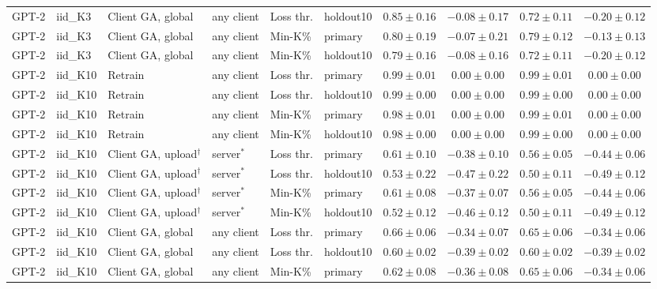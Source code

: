 \begin{table}[t]
\begin{tabular*}{\textwidth}{@{\extracolsep{\fill}}llllllcccc@{}}
GPT-2 & iid\_K3 & Client GA, global & any client & Loss thr. & holdout10 & $0.85 \pm 0.16$ & $-0.08 \pm 0.17$ & $0.72 \pm 0.11$ & $-0.20 \pm 0.12$ \\
GPT-2 & iid\_K3 & Client GA, global & any client & Min-K\% & primary & $0.80 \pm 0.19$ & $-0.07 \pm 0.21$ & $0.79 \pm 0.12$ & $-0.13 \pm 0.13$ \\
GPT-2 & iid\_K3 & Client GA, global & any client & Min-K\% & holdout10 & $0.79 \pm 0.16$ & $-0.08 \pm 0.16$ & $0.72 \pm 0.11$ & $-0.20 \pm 0.12$ \\
GPT-2 & iid\_K10 & Retrain & any client & Loss thr. & primary & $0.99 \pm 0.01$ & $0.00 \pm 0.00$ & $0.99 \pm 0.01$ & $0.00 \pm 0.00$ \\
GPT-2 & iid\_K10 & Retrain & any client & Loss thr. & holdout10 & $0.99 \pm 0.00$ & $0.00 \pm 0.00$ & $0.99 \pm 0.00$ & $0.00 \pm 0.00$ \\
GPT-2 & iid\_K10 & Retrain & any client & Min-K\% & primary & $0.98 \pm 0.01$ & $0.00 \pm 0.00$ & $0.99 \pm 0.01$ & $0.00 \pm 0.00$ \\
GPT-2 & iid\_K10 & Retrain & any client & Min-K\% & holdout10 & $0.98 \pm 0.00$ & $0.00 \pm 0.00$ & $0.99 \pm 0.00$ & $0.00 \pm 0.00$ \\
GPT-2 & iid\_K10 & Client GA, upload$^{\dagger}$ & server$^{*}$ & Loss thr. & primary & $0.61 \pm 0.10$ & $-0.38 \pm 0.10$ & $0.56 \pm 0.05$ & $-0.44 \pm 0.06$ \\
GPT-2 & iid\_K10 & Client GA, upload$^{\dagger}$ & server$^{*}$ & Loss thr. & holdout10 & $0.53 \pm 0.22$ & $-0.47 \pm 0.22$ & $0.50 \pm 0.11$ & $-0.49 \pm 0.12$ \\
GPT-2 & iid\_K10 & Client GA, upload$^{\dagger}$ & server$^{*}$ & Min-K\% & primary & $0.61 \pm 0.08$ & $-0.37 \pm 0.07$ & $0.56 \pm 0.05$ & $-0.44 \pm 0.06$ \\
GPT-2 & iid\_K10 & Client GA, upload$^{\dagger}$ & server$^{*}$ & Min-K\% & holdout10 & $0.52 \pm 0.12$ & $-0.46 \pm 0.12$ & $0.50 \pm 0.11$ & $-0.49 \pm 0.12$ \\
GPT-2 & iid\_K10 & Client GA, global & any client & Loss thr. & primary & $0.66 \pm 0.06$ & $-0.34 \pm 0.07$ & $0.65 \pm 0.06$ & $-0.34 \pm 0.06$ \\
GPT-2 & iid\_K10 & Client GA, global & any client & Loss thr. & holdout10 & $0.60 \pm 0.02$ & $-0.39 \pm 0.02$ & $0.60 \pm 0.02$ & $-0.39 \pm 0.02$ \\
GPT-2 & iid\_K10 & Client GA, global & any client & Min-K\% & primary & $0.62 \pm 0.08$ & $-0.36 \pm 0.08$ & $0.65 \pm 0.06$ & $-0.34 \pm 0.06$ \\

\end{tabular*}
\end{table}

